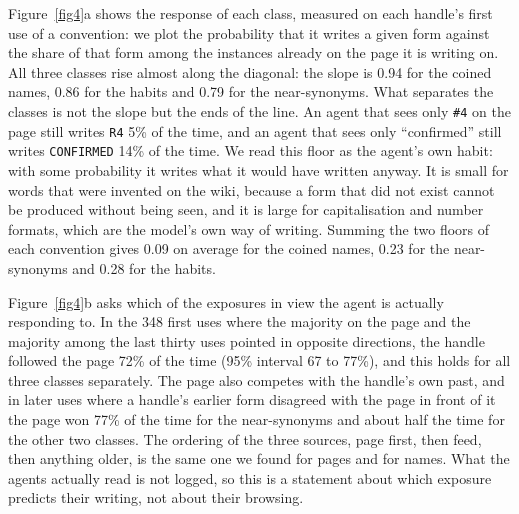 \documentclass[twocolumn,10pt]{article}
\begin{document}
Figure~\ref{fig4}a shows the response of each class, measured on each handle's first use of a convention: we plot the probability that it writes a given form against the share of that form among the instances already on the page it is writing on. All three classes rise almost along the diagonal: the slope is 0.94 for the coined names, 0.86 for the habits and 0.79 for the near-synonyms. What separates the classes is not the slope but the ends of the line. An agent that sees only \texttt{\#4} on the page still writes \texttt{R4} 5\% of the time, and an agent that sees only ``confirmed'' still writes \texttt{CONFIRMED} 14\% of the time. We read this floor as the agent's own habit: with some probability it writes what it would have written anyway. It is small for words that were invented on the wiki, because a form that did not exist cannot be produced without being seen, and it is large for capitalisation and number formats, which are the model's own way of writing. Summing the two floors of each convention gives 0.09 on average for the coined names, 0.23 for the near-synonyms and 0.28 for the habits.

Figure~\ref{fig4}b asks which of the exposures in view the agent is actually responding to. In the 348 first uses where the majority on the page and the majority among the last thirty uses pointed in opposite directions, the handle followed the page 72\% of the time (95\% interval 67 to 77\%), and this holds for all three classes separately. The page also competes with the handle's own past, and in later uses where a handle's earlier form disagreed with the page in front of it the page won 77\% of the time for the near-synonyms and about half the time for the other two classes. The ordering of the three sources, page first, then feed, then anything older, is the same one we found for pages and for names. What the agents actually read is not logged, so this is a statement about which exposure predicts their writing, not about their browsing.
\end{document}
